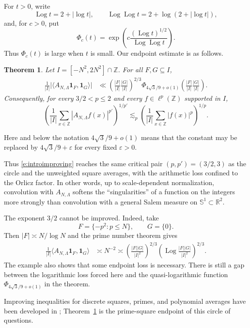 \documentclass[12pt,reqno]{amsart}
\numberwithin{equation}{section}
\newtheorem{theorem}[equation]{Theorem}
\theoremstyle{definition}
\theoremstyle{remark}
\newcommand{\Log}{\operatorname{Log}}
\begin{document}
For $t>0$, write
\[
 \Log t=2+|\log t|,
 \qquad \Log\Log t=2+\log(2+|\log t|),
\]
and, for $c>0$, put
\[
 \Phi_c(t)=\exp\left(c\frac{(\Log t)^{1/2}}{\Log\Log t}\right).
\]
Thus \(\Phi_c(t)\) is large when \(t\) is small. Our endpoint estimate is as follows.


\begin{theorem}\label{t:improvingfixed}
Let \(I=[-N^2,2N^2]\cap\mathbb Z\).  For all \(F,G\subseteq I\),
\begin{align}\label{e:introimproving}
 \frac1{|I|}
 \bigl|\langle A_{N,\Lambda}\mathbf1_F,\mathbf1_G\rangle\bigr|
 &\ll
 \left(\frac{|F|}{|I|}\frac{|G|}{|I|}\right)^{2/3}
 \Phi_{4\sqrt3/9+o(1)}
 \left(\frac{|F|}{|I|}\frac{|G|}{|I|}\right).
\end{align}
Consequently, for every \(3/2<p\leq2\) and every
\(f\in\ell^p(\mathbb Z)\) supported in $I$,
\[
 \left(\frac1{|I|}\sum_{x\in\mathbb Z}
 |A_{N,\Lambda}f(x)|^{p'}\right)^{1/p'}
 \lesssim_p
 \left(\frac1{|I|}\sum_{x\in\mathbb Z}|f(x)|^p\right)^{1/p}.
\]
\end{theorem}



Here and below the notation $4\sqrt3/9+o(1)$ means that the constant
may be replaced by $4\sqrt3/9+\varepsilon$ for every fixed
$\varepsilon>0$.


Thus \eqref{e:introimproving} reaches the same critical pair
$(p,p')=(3/2,3)$ as the circle and the unweighted square averages, with
the arithmetic loss confined to the Orlicz factor.  In other words, up
to scale-dependent normalization, convolution with $A_{N,\Lambda}$
softens the ``singularities'' of a function on the integers more strongly
than convolution with a general Salem measure on
$\mathbb S^1\subset\mathbb R^2$.



The exponent $3/2$ cannot be improved.  Indeed, take
\[
 F=\{-p^2:p\leq N\},\qquad G=\{0\}.
\]
Then $|F|\asymp N/\log N$ and the prime number theorem gives
\begin{align*}
 \frac1{|I|}\langle A_{N,\Lambda}\mathbf1_F,\mathbf1_G\rangle
 &\asymp N^{-2}\asymp
 \left(\frac{|F||G|}{|I|^2}\right)^{2/3}
 \left(\Log\frac{|F||G|}{|I|^2}\right)^{2/3}.
\end{align*}
The example also shows that some endpoint loss is necessary.  There is
still a  gap between the logarithmic loss forced here and
the quasi-logarithmic function $\Phi_{4\sqrt3/9+o(1)}$ in the theorem.


Improving inequalities for discrete squares, primes, and polynomial
averages have been developed in
\cite{LHF,HLKF,LMR,HKLMY}; Theorem~\ref{t:improvingfixed} is the
prime-square endpoint of this circle of questions.
\end{document}

